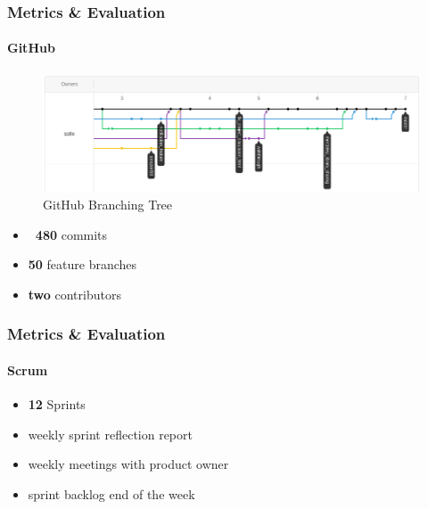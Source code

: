 \documentclass{beamer}
\begin{document}
\begin{frame}
\frametitle{Metrics \& Evaluation}
\framesubtitle{GitHub}
	\begin{figure}
		\includegraphics[scale=0.3]{./images/github_tree.png}
		\caption{GitHub Branching Tree}
	\end{figure}
	\begin{itemize}
		\item \textbf{~480} commits
		\item \textbf{50} feature branches
		\item \textbf{two} contributors
	\end{itemize}
\end{frame}

\begin{frame}
\frametitle{Metrics \& Evaluation}
\framesubtitle{Scrum}
	\begin{itemize}
	 \item \textbf{12} Sprints 
	 \item weekly sprint reflection report
	 \item weekly meetings with product owner
     \item sprint backlog end of the week		
	\end{itemize}
\end{frame}
\end{document}

